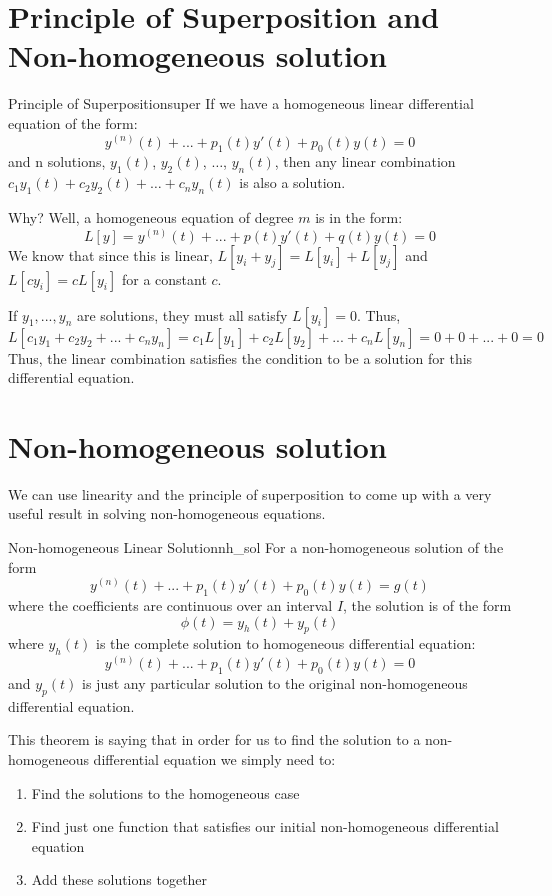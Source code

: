 \documentclass{report}
\begin{document}
\section{Principle of Superposition and Non-homogeneous solution}

\begin{mytheo}{Principle of Superposition}{super}
 If we have a homogeneous linear differential equation of the form:
 $$y^{(n)}(t) + ... + p_1(t)y'(t) + p_0(t)y(t) = 0$$
 and n solutions, $y_1(t)$, $y_2(t)$, $\dots$, $y_n(t)$, then any linear combination $c_1y_1(t) + c_2y_2(t) + \dots + c_ny_n(t)$ is also a solution.
\end{mytheo}


Why?
Well, a homogeneous equation of degree $m$ is in the form:
$$L[y] = y^{(n)}(t) + ... + p(t)y'(t) + q(t)y(t) = 0$$
We know that since this is linear, $L[y_i+y_j] = L[y_i] + L[y_j]$ and $L[cy_i] = cL[y_i]$ for a constant $c$.

If $y_1, ..., y_n$ are solutions, they must all satisfy $L[y_i] = 0$. Thus,
$$L[c_1y_1+c_2y_2+...+c_ny_n] = c_1L[y_1] + c_2L[y_2] + ... + c_nL[y_n] = 0 + 0 + ... + 0 = 0$$
Thus, the linear combination satisfies the condition to be a solution for this differential equation.

\section{Non-homogeneous solution}
We can use linearity and the principle of superposition to come up with a very useful result in solving non-homogeneous equations.

\begin{mytheo}{Non-homogeneous Linear Solution}{nh_sol}
 For a non-homogeneous solution of the form
 $$y^{(n)}(t) + ... + p_1(t)y'(t) + p_0(t)y(t) = g(t)$$
 where the coefficients are continuous over an interval $I$, the solution is of the form
 $$\phi(t) = y_h(t) + y_p(t)$$
 where $y_h(t)$ is the complete solution to homogeneous differential equation:
 $$y^{(n)}(t) + ... + p_1(t)y'(t) + p_0(t)y(t) = 0$$
 and $y_p(t)$ is just any particular solution to the original non-homogeneous differential equation.
\end{mytheo}

This theorem is saying that in order for us to find the solution to a non-homogeneous differential equation we simply need to:
\begin{enumerate}
    \item Find the solutions to the homogeneous case
    \item Find just one function that satisfies our initial non-homogeneous differential equation
    \item Add these solutions together
\end{enumerate}
\end{document}
